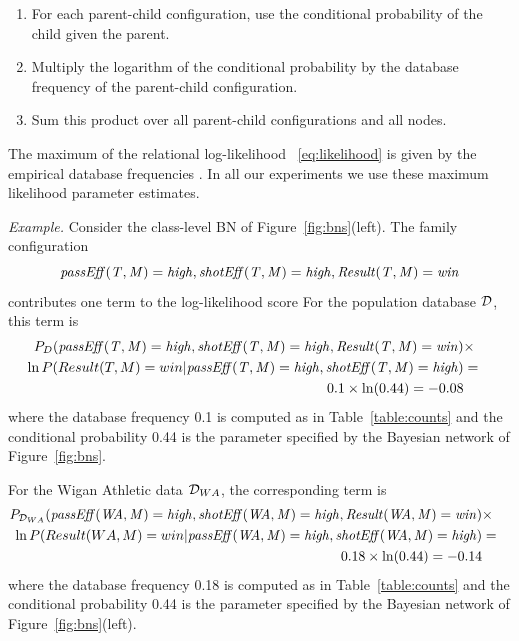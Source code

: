 {	\begin{enumerate}
		\item For each parent-child configuration, 
		use the conditional probability of the child given the parent.
		\item Multiply the logarithm of the conditional probability by the database frequency of the parent-child configuration. 
		\item Sum this product over all parent-child configurations and all nodes. 
	\end{enumerate}
	
	
	The maximum of the relational log-likelihood ~\eqref{eq:likelihood} is given by the empirical database frequencies \cite[Prop.3.1.]{Schulte2011}. In all our experiments we use these maximum likelihood parameter estimates.
	
	{\em Example.} Consider the class-level BN of Figure~\ref{fig:bns}(left). The family configuration \begin{displaymath} \it{passEff(T,M)=high}, shotEff(T,M)=high, Result(T,M)=win\end{displaymath} contributes one term to the log-likelihood score For the population database $\mathcal{D}$, this term is 
\begin{eqnarray*}
P_{D}(\it{passEff(T,M)=high}, shotEff(T,M)=high, Result(T,M)=win) &\times&\\ \ln P(Result(T,M)=win|\it{passEff(T,M)=high}, shotEff(T,M)=high)  &=&\\ 0.1 \times \ln(0.44) =-0.08 & &
\end{eqnarray*}
where the database frequency 0.1 is computed as in Table~\ref{table:counts} and the conditional probability 0.44 is the parameter specified by the Bayesian network of Figure~\ref{fig:bns}. 
	
		
	For the  Wigan Athletic data $\mathcal{D}_{WA}$, the corresponding term is 
	\begin{eqnarray*}
P_{\mathcal{D}_{WA}}(\it{passEff(WA,M)=high}, shotEff(WA,M)=high, Result(WA,M)=win) &\times&\\ \ln P(Result(WA,M)=win|\it{passEff(WA,M)=high}, shotEff(WA,M)=high)  &=&\\ 0.18 \times \ln(0.44) =-0.14 & &
\end{eqnarray*}
where the database frequency 0.18 is computed as in Table~\ref{table:counts} and the conditional probability 0.44 is the parameter specified by the Bayesian network of Figure~\ref{fig:bns}(left). 


}

